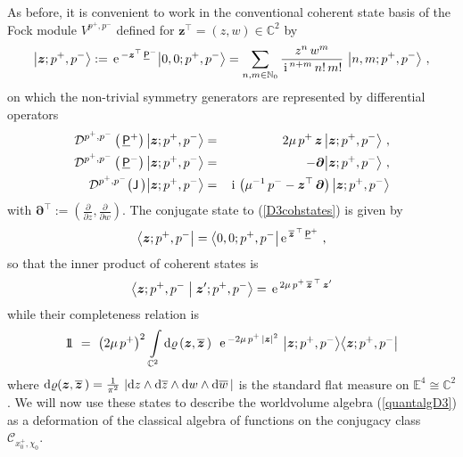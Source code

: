 \documentclass[11pt,a4paper]{article}
\newcommand{\ii}{{\rm i}}
\newcommand{\mbf}[1]{{\boldsymbol {#1} }}
\def\ii{{\,{\rm i}\,}}
\def\dd{{\rm d}}
\def\J{{\sf J}}
\def\Pu{\underline{\sf P}{}}
\def\mz{{\mbf z}}
\def\mdell{{\mbf\partial}}
\def\mcDp{{\mathcal D}^{p^+,p^-}}
\newcommand{\complex}{{\mathbb C}} %
\newcommand{\nat}{{\mathbb N}} %
\newcommand{\eucl}{{\mathbb E}}
\newcommand{\id}{{1\!\!1}} %
\def\e{{\,\rm e}\,}
\def\bea{\begin{eqnarray}}
\def\eea{\end{eqnarray}}
\newcommand{\beq}{\begin{eqnarray}}
\newcommand{\eeq}{\end{eqnarray}}
\begin{document}
As before, it is convenient to work in the conventional coherent state
basis of the Fock module $V^{p^+,p^-}$ defined for
$\mz^\top=(z,w)\in\complex^2$ by
\beq
\bigl|\mz;p^+,p^-\bigr\rangle:=\e^{-\mz^\top\,\Pu^-}
\bigl|0,0;p^+,p^-\bigr\rangle=\sum_{n,m\in\nat_0}
\frac{z^n\,w^m}{\ii^{n+m}\,n!\,m!}~\bigl|n,m;p^+,p^-
\bigr\rangle \ ,
\label{D3cohstates}\eeq
on which the non-trivial symmetry generators are represented by
differential operators
\bea
\mcDp\left(\,\Pu^+\right)\bigl|\mz;p^+,p^-\bigr\rangle&=&
2\mu\,p^+\,\mz\,\bigl|\mz;p^+,p^-\bigr\rangle \ , \nonumber\\
\mcDp\left(\,\Pu^-\right)\bigl|\mz;p^+,p^-\bigr\rangle&=&
-\mdell\bigl|\mz;p^+,p^-\bigr\rangle \ , \nonumber\\
\mcDp\bigl(\J\,\bigr)\bigl|\mz;p^+,p^-\bigr\rangle&=&
\ii\left(\mu^{-1}\,p^--\mz^\top\,\mdell\right)
\bigl|\mz;p^+,p^-\bigr\rangle
\label{symactioncohD3}\eea
with $\mdell^\top:=(\frac\partial{\partial z},\frac\partial{\partial
  w})$. The conjugate state to (\ref{D3cohstates}) is given by
\beq
\bigl\langle\mz;p^+,p^-\bigr|=\bigl\langle0,0;p^+,p^-\bigr|
\e^{\overline{\mz}{}^{\,\top}\,\Pu^+} \ ,
\label{conjD3cohstates}\eeq
so that the inner product of coherent states is
\beq
\bigl\langle\mz;p^+,p^-\bigm|\mz';p^+,p^-\bigr\rangle=
\e^{2\mu\,p^+\,\overline{\mz}{}^{\,\top}\,\mz'}
\label{innprodcohD3}\eeq
while their completeness relation is
\beq
\id~=~\left(2\mu\,p^+\right)^2\,\int\limits_{\complex^2}
\dd\varrho\left(\mz,\overline{\mz}\,\right)~\e^{-2\mu\,p^+\,|\mz|^2}~
\bigl|\mz;p^+,p^-\bigr\rangle\bigl\langle\mz;p^+,p^-\bigr|
\label{D3complrel}\eeq
where $\dd\varrho(\mz,\overline{\mz}\,)=\frac1{\pi^2}~|\dd
z\wedge\dd\overline{z}\wedge\dd w\wedge\dd\overline{w}\,|$ is the
standard flat measure on $\eucl^4\cong\complex^2$. We will now use
these states to describe the worldvolume algebra (\ref{quantalgD3}) as
a deformation of the classical algebra of functions on the conjugacy
class $\mathcal{C}_{x_0^+,\chi^{~}_0}$.
\end{document}
